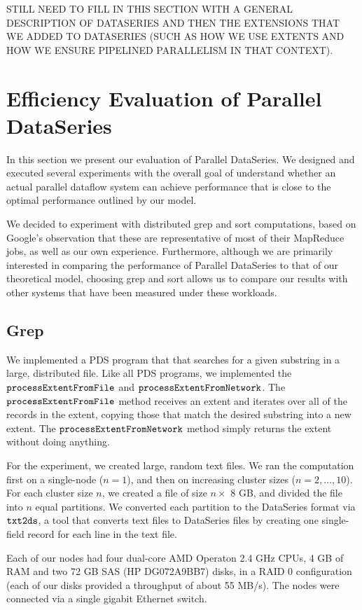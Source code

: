 \documentclass{acm_proc_article-sp}
\begin{document}
STILL NEED TO FILL IN THIS SECTION WITH A GENERAL DESCRIPTION OF DATASERIES AND THEN THE EXTENSIONS THAT WE ADDED TO DATASERIES (SUCH AS HOW WE USE EXTENTS AND HOW WE ENSURE PIPELINED PARALLELISM IN THAT CONTEXT).

\section{Efficiency Evaluation of Parallel DataSeries}

In this section we present our evaluation of Parallel DataSeries. We designed and executed several experiments with the overall goal of understand whether an actual parallel dataflow system can achieve performance that is close to the optimal performance outlined by our model.

We decided to experiment with distributed grep and sort computations, based on Google's observation that these are representative of most of their MapReduce jobs, as well as our own experience. Furthermore, although we are primarily interested in comparing the performance of Parallel DataSeries to that of our theoretical model, choosing grep and sort allows us to compare our results with other systems that have been measured under these workloads.

\subsection{Grep}

We implemented a PDS program that that searches for a given substring in a large, distributed file. Like all PDS programs, we implemented the $\tt processExtentFromFile$ and $\tt processExtentFromNetwork$. The $\tt processExtentFromFile$ method receives an extent and iterates over all of the records in the extent, copying those that match the desired substring into a new extent. The $\tt processExtentFromNetwork$ method simply returns the extent without doing anything.

For the experiment, we created large, random text files. We ran the computation first on a single-node ($n = 1$), and then on increasing cluster sizes ($n = 2, \ldots, 10$). For each cluster size $n$, we created a file of size $n \times$ 8 GB, and divided the file into $n$ equal partitions. We converted each partition to the DataSeries format via $\tt txt2ds$, a tool that converts text files to DataSeries files by creating one single-field record for each line in the text file.

Each of our nodes had four dual-core AMD Operaton 2.4 GHz CPUs, 4 GB of RAM and two 72 GB SAS (HP DG072A9BB7) disks, in a RAID 0 configuration (each of our disks provided a throughput of about 55 MB/s). The nodes were connected via a single gigabit Ethernet switch. 
\end{document}
